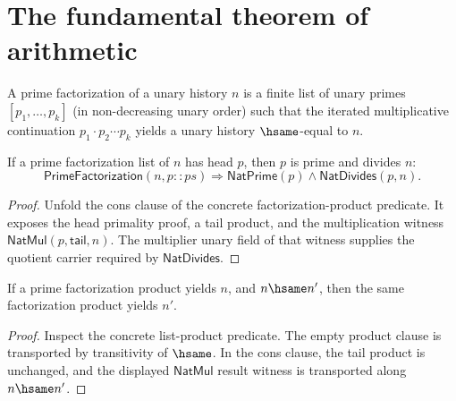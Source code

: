 \section{The fundamental theorem of arithmetic}

\begin{definition}
\label{def:prime-factorization-list}
A prime factorization of a unary history \(n\) is a finite list of unary primes \([p_1, \dots, p_k]\) (in non-decreasing unary order) such that the iterated multiplicative continuation \(p_1 \cdot p_2 \cdots p_k\) yields a unary history \(\hsame\)-equal to \(n\).
\end{definition}

\begin{theorem}
\label{thm:prime-factorization-cons-head-divides}
If a prime factorization list of \(n\) has head \(p\), then \(p\) is prime and
divides \(n\):
$$
\mathsf{PrimeFactorization}(n,p::ps)
\Longrightarrow
\mathsf{NatPrime}(p)\land\mathsf{NatDivides}(p,n).
$$
\end{theorem}
\begin{proof}
Unfold the cons clause of the concrete factorization-product predicate. It
exposes the head primality proof, a tail product, and the multiplication
witness \(\mathsf{NatMul}(p,\mathsf{tail},n)\). The multiplier unary field of
that witness supplies the quotient carrier required by \(\mathsf{NatDivides}\).
\end{proof}

\begin{theorem}
\label{thm:prime-factorization-product-result-hsame-transport}
If a prime factorization product yields \(n\), and \(n\hsame n'\), then the
same factorization product yields \(n'\).
\end{theorem}
\begin{proof}
Inspect the concrete list-product predicate. The empty product clause is
transported by transitivity of \(\hsame\). In the cons clause, the tail product
is unchanged, and the displayed \(\mathsf{NatMul}\) result witness is
transported along \(n\hsame n'\).
\end{proof}


